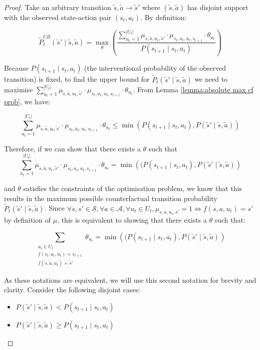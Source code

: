 \begin{proof} Take an arbitrary transition $\tilde{s}, \tilde{a} \rightarrow \tilde{s}'$ where $(\tilde{s}, \tilde{a})$ has disjoint support with the observed state-action pair $(s_t, a_t)$. By definition:

\[\tilde{P}_{t}^{UB}(\tilde{s}' \mid \tilde{s}, \tilde{a}) = \max_\theta \left( \frac{\sum_{u_t = 1}^{|U_t|} \mu_{\tilde{s}, \tilde{a}, u_t, \tilde{s}'} \cdot \mu_{s_t, a_t, u_t, s_{t+1}} \cdot \theta_{u_t}}{P(s_{t+1} \mid s_t, a_t)} \right)\]

Because $P(s_{t+1} \mid s_t, a_t)$ (the interventional probability of the observed transition) is fixed, to find the upper bound for $\tilde{P}_t(\tilde{s}' \mid \tilde{s}, \tilde{a})$ we need to maximise $\sum_{u_t = 1}^{|U_t|} \mu_{\tilde{s}, \tilde{a}, u_t, \tilde{s}'} \cdot \mu_{s_t, a_t, u_t, s_{t+1}} \cdot \theta_{u_t}$. From Lemma \ref{lemma:absolute max cf prob}, we have:

\[
\sum_{u_t = 1}^{|U_t|} \mu_{\tilde{s}, \tilde{a}, u_t, \tilde{s}'} \cdot \mu_{s_t, a_t, u_t, s_{t+1}} \cdot \theta_{u_t} \leq \min\left(P(s_{t+1} \mid s_t, a_t), P(\tilde{s}' \mid \tilde{s}, \tilde{a})\right)
\]

Therefore, if we can show that there exists a $\theta$ such that
\[
\sum_{u_t = 1}^{|U_t|} \mu_{\tilde{s}, \tilde{a}, u_t, \tilde{s}'} \cdot \mu_{s_t, a_t, u_t, s_{t+1}} \cdot \theta_{u_t} = \min\left((P(s_{t+1} \mid s_t, a_t), P(\tilde{s}' \mid \tilde{s}, \tilde{a})\right)
\]

and $\theta$ satisfies the constraints of the optimisation problem, we know that this results in the maximum possible counterfactual transition probability $\tilde{P}_t(\tilde{s}' \mid \tilde{s}, \tilde{a})$. Since $\forall s,s' \in \mathcal{S}, \forall a \in \mathcal{A}, \forall u_t \in U_t, \mu_{s, a, u_t, s'} = 1 \iff f(s, a, u_t) = s'$ by definition of $\mu$, this is equivalent to showing that there exists a $\theta$ such that:

\[
\sum_{\substack{u_t \in U_t \\f(s_t, a_t, u_t) = s_{t+1} \\ f(\tilde{s}, \tilde{a}, u_t) = \tilde{s}'}} \theta_{u_t}= \min\left((P(s_{t+1} \mid s_t, a_t), P(\tilde{s}' \mid \tilde{s}, \tilde{a})\right)
\]

As these notations are equivalent, we will use this second notation for brevity and clarity. Consider the following disjoint cases:

\begin{itemize}
    \item $P(\tilde{s}' \mid \tilde{s}, \tilde{a}) < P(s_{t+1} \mid s_t, a_t)$
    \item $P(\tilde{s}' \mid \tilde{s}, \tilde{a}) \geq P(s_{t+1} \mid s_t, a_t)$
\end{itemize}


\end{proof}
